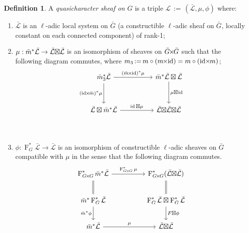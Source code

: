 \documentclass[11pt]{amsart}
\makeatletter
\theoremstyle{plain}
\theoremstyle{definition}
\newtheorem{definition}[theorem]{Definition}
\theoremstyle{remark}
\newcommand{\Frob}[1]{\operatorname{F}_{#1}}
\DeclareMathOperator{\id}{id}
\newcommand{\ceq}{{\, :=\, }}
\newcommand{\cs}[1]{{\mathcal{#1}}}
\newcommand{\gcs}[1]{{\mathcal{\bar #1}}}
\newcommand{\labitem}[2]{%
\def\@itemlabel{\textbf{#1}}
\item
\def\@currentlabel{#1}\label{#2}}
\newcommand{\bm}{\bar{m}}
\newcommand{\bG}{\bar{G}}
\newcommand{\tight}[3]{\hspace{-#1pt}{#2}\hspace{-#3pt}}
\newcommand{\bGxG}{\text{$\bar{G} \tight{1}{\times}{1} \bar{G}$}}
\newcommand{\GxxG}{\text{$G \tight{1}{\times}{1} G$}}
\newcommand{\LxL}{\text{$\gcs{L} \tight{0}{\boxtimes}{0} \gcs{L}$}}
\makeatother
\begin{document}
\begin{definition}\label{def:QC}
A \emph{quasicharacter sheaf on $G$} is a triple
$\cs{L}\ceq (\gcs{L},\mu,\phi)$ where:
\begin{enumerate}
\labitem{(CS.0)}{CS.0} $\gcs{L}$ is an $\ell$-adic local system on $\bG$ (a constructible $\ell$-adic sheaf on $\bG$, locally constant on each connected component) of rank-1; 
\labitem{(CS.1)}{CS.1} $\mu: \bm^* \gcs{L} \to \LxL$
  is an isomorphism of sheaves on $\bGxG$ such that the following diagram commutes, 
  where $m_3 \ceq m\circ (m\tight{1}{\times}{2}\id) = m\circ (\id\tight{2}{\times}{1} m)$;
%
  \[
  \begin{tikzcd}[row sep=30]
  \bm_3^*\gcs{L} \arrow{rr}{(\bm \tight{1}{\times}{2} \id)^*\mu} \arrow[swap]{d}{(\id \tight{2}{\times}{1} \bm)^*\mu}
    &&  \bm^*\gcs{L} \boxtimes \gcs{L} \dar{\mu \tight{0}{\boxtimes}{1} \id} \\
    \gcs{L} \boxtimes \bm^* \gcs{L} \arrow{rr}{\id \boxtimes \mu}
    &&  \gcs{L} \tight{0}{\boxtimes}{0} \LxL\\
  \end{tikzcd}
  \]
  
%
\labitem{(CS.2)}{CS.2} $\phi : \Frob{G}^* \gcs{L} \to \gcs{L}$ is an
  isomorphism of constructible $\ell$-adic sheaves on $\bG$ compatible with $\mu$ in the sense that the following diagram commutes.
%
  \[
  \begin{tikzcd}[row sep=20]
  \Frob{\GxxG}^* \bm^* \gcs{L} \arrow{rr}{\Frob{\GxxG}^*\mu}
    && \Frob{\GxxG}^*(\LxL)\\
    \arrow[equal]{u} \bm^*  \Frob{G}^* \gcs{L} \arrow[swap]{d}{\bm^* \phi}
    && \Frob{G}^*\gcs{L}\boxtimes \Frob{G}^*\gcs{L} \dar{F\boxtimes \phi} \arrow[equal]{u} \\
    \bm^*\gcs{L} \arrow{rr}{\mu}
    && \LxL\\
  \end{tikzcd}
  \]
\end{enumerate}
\end{definition}
\end{document}
